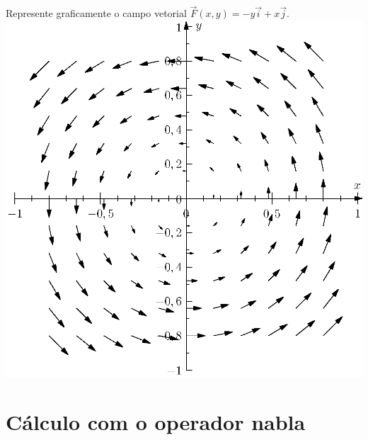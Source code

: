 \begin{ex} Represente graficamente o campo vetorial $\vec{F}(x,y)=-y\vec{i}+x\vec{j}$.
\includegraphics{cap_campos/figs/campo_exemplo_3}
\end{ex}



\section{Cálculo com o operador nabla}
